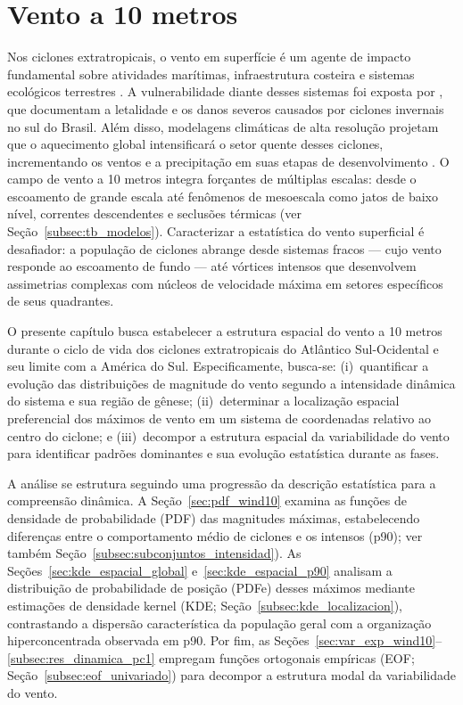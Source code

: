 \chapter{Vento a 10 metros}\label{cap:resultados_wind10}


Nos ciclones extratropicais, o vento em superfície é um agente de impacto fundamental sobre atividades marítimas, infraestrutura costeira e sistemas ecológicos terrestres \citep{gramcianinov2023impact}.
A vulnerabilidade diante desses sistemas foi exposta por \citet{bartolomei2024extremos}, que documentam a letalidade e os danos severos causados por ciclones invernais no sul do Brasil.
Além disso, modelagens climáticas de alta resolução projetam que o aquecimento global intensificará o setor quente desses ciclones, incrementando os ventos e a precipitação em suas etapas de desenvolvimento \citep{gentile2025response}.
O campo de vento a 10 metros integra forçantes de múltiplas escalas: desde o escoamento de grande escala até fenômenos de mesoescala como jatos de baixo nível, correntes descendentes e seclusões térmicas (ver Seção~\ref{subsec:tb_modelos}).
Caracterizar a estatística do vento superficial é desafiador: a população de ciclones abrange desde sistemas fracos --- cujo vento responde ao escoamento de fundo --- até vórtices intensos que desenvolvem assimetrias complexas com núcleos de velocidade máxima em setores específicos de seus quadrantes.

O presente capítulo busca estabelecer a estrutura espacial do vento a 10 metros durante o ciclo de vida dos ciclones extratropicais do Atlântico Sul-Ocidental e seu limite com a América do Sul.
Especificamente, busca-se: (i)~quantificar a evolução das distribuições de magnitude do vento segundo a intensidade dinâmica do sistema e sua região de gênese; (ii)~determinar a localização espacial preferencial dos máximos de vento em um sistema de coordenadas relativo ao centro do ciclone; e (iii)~decompor a estrutura espacial da variabilidade do vento para identificar padrões dominantes e sua evolução estatística durante as fases.

A análise se estrutura seguindo uma progressão da descrição estatística para a compreensão dinâmica.
A Seção~\ref{sec:pdf_wind10} examina as funções de densidade de probabilidade (PDF) das magnitudes máximas, estabelecendo diferenças entre o comportamento médio de ciclones e os intensos (p90); ver também Seção~\ref{subsec:subconjuntos_intensidad}).
As Seções~\ref{sec:kde_espacial_global} e~\ref{sec:kde_espacial_p90} analisam a distribuição de probabilidade de posição (PDFe) desses máximos mediante estimações de densidade kernel (KDE; Seção~\ref{subsec:kde_localizacion}), contrastando a dispersão característica da população geral com a organização hiperconcentrada observada em p90.
Por fim, as Seções~\ref{sec:var_exp_wind10}--\ref{subsec:res_dinamica_pc1} empregam funções ortogonais empíricas (EOF; Seção~\ref{subsec:eof_univariado}) para decompor a estrutura modal da variabilidade do vento.

